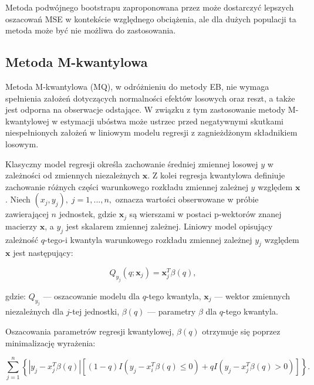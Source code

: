 Metoda podwójnego bootstrapu zaproponowana przez \citep{hall2006} może dostarczyć lepszych oszacowań MSE w kontekście względnego obciążenia, ale dla dużych populacji ta metoda może być nie możliwa do zastosowania.

\subsection{Metoda M-kwantylowa}

Metoda M-kwantylowa (MQ), w odróżnieniu do metody EB, nie wymaga spełnienia założeń dotyczących normalności efektów losowych oraz reszt, a także jest odporna na obserwacje odstające. W związku z tym zastosowanie metody M-kwantylowej w estymacji ubóstwa może ustrzec przed negatywnymi skutkami niespełnionych założeń w liniowym modelu regresji z zagnieżdżonym składnikiem losowym.


Klasyczny model regresji określa zachowanie średniej zmiennej losowej $y$ w zależności od zmiennych niezależnych $\boldsymbol{x}$. Z kolei regresja kwantylowa \citep{koenker2005} definiuje zachowanie różnych części warunkowego rozkładu zmiennej zależnej $y$ względem $\boldsymbol{x}$. Niech $(x_j, y_j), \; j=1,...,n,$ oznacza wartości obserwowane w próbie zawierającej $n$ jednostek, gdzie $\boldsymbol{x}_j$ są wierszami w postaci p-wektorów znanej macierzy $\boldsymbol{x}$, a $y_j$ jest skalarem zmiennej zależnej. Liniowy model opisujący zależność $q$-tego-i kwantyla warunkowego rozkładu zmiennej zależnej $y_j$ względem $\boldsymbol{x}$ jest następujący:

\begin{equation}
Q_{y_j}(q;\boldsymbol{x}_j)=\boldsymbol{x}_j^T\beta(q),
\label{eq:lmq}
\end{equation}

gdzie: $Q_{y_j}$ --- oszacowanie modelu dla $q$-tego kwantyla, $\boldsymbol{x}_j$ --- wektor zmiennych niezależnych dla $j$-tej jednostki, $\beta(q)$ --- parametry $\beta$ dla $q$-tego kwantyla.

Oszacowania parametrów regresji kwantylowej, $\beta(q)$ otrzymuje się poprzez minimalizację wyrażenia:

\begin{equation}
\sum\limits_{j=1}^{n}{\left\{|y_j-x_j^T\beta(q)|\left[(1-q)I(y_j-x_i^T\beta(q)\leq 0)+qI(y_j-x_j^T\beta(q)> 0)\right]\right\}}.
\end{equation}

